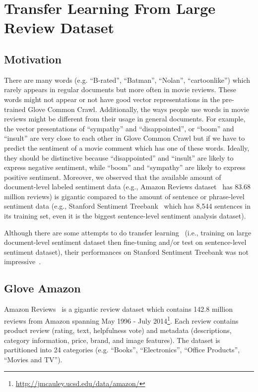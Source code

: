 \section{Transfer Learning From Large Review Dataset}
\subsection{Motivation}
There are many words (e.g. ``B-rated'', ``Batman'', ``Nolan'', ``cartoonlike'') which rarely appears in regular documents but more often in movie reviews.
These words might not appear or not have good vector representations in the pre-trained Glove Common Crawl.
Additionally, the ways people use words in movie reviews might be different from their usage in general documents.
For example, the vector presentations of ``sympathy'' and ``disappointed'', or ``boom'' and ``insult'' are very close to each other in Glove Common Crawl but if we have to predict the sentiment of a movie comment which has one of these words.
Ideally, they should be distinctive because ``disappointed'' and ``insult'' are likely to express negative sentiment, while ``boom'' and ``sympathy'' are likely to express positive sentiment.
%
%
Moreover, we observed that the available amount of document-level labeled sentiment data (e.g., Amazon Reviews dataset~\cite{amazon-reviews} has 83.68 million reviews) is gigantic compared to the amount of sentence or phrase-level sentiment data (e.g., Stanford Sentiment Treebank~\cite{socher2013recursive} which has 8,544 sentences in its training set, even it is the biggest sentence-level sentiment analysis dataset).


Although there are some attempts to do transfer learning~\cite{group-instance, re-embedding} (i.e., training on large document-level sentiment dataset then fine-tuning and/or test on sentence-level sentiment dataset), their performances on Stanford Sentiment Treebank was not impressive~\cite{group-instance}.


\subsection{Glove Amazon}\label{sec:glove-amazon}
Amazon Reviews~\cite{amazon-reviews} is a gigantic review dataset
which contains 142.8 million reviews from Amazon spanning May 1996 - July 2014\footnote{\url{http://jmcauley.ucsd.edu/data/amazon/}}.
Each review contains product review (rating, text, helpfulness vote) and metadata (descriptions, category information, price, brand, and image features).
The dataset is partitioned into 24 categories (e.g. ``Books'', ``Electronics'', ``Office Products'', ``Movies and TV'').

